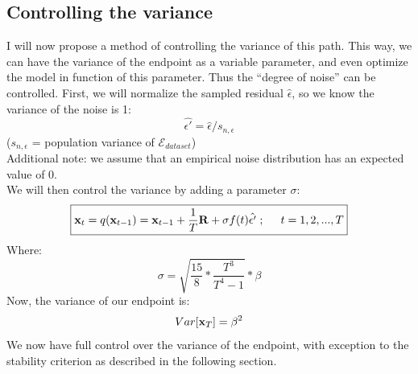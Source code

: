 \documentclass[twocolumn]{article}
\begin{document}
\begin{appendices}
\subsection{Controlling the variance}
I will now propose a method of controlling the variance of this path. This way, we can have the variance of the endpoint as a variable parameter, and even optimize the model in function of this parameter. Thus the ``degree of noise'' can be controlled.   
First, we will normalize the sampled residual $\hat{\epsilon}$, so we know the variance of the noise is 1:
\begin{equation}
    \hat{\epsilon'} = \hat{\epsilon} / s_{n,\epsilon}
\end{equation}
($s_{n,\epsilon}$ = population variance of $\mathcal{E}_{dataset}$)\\
Additional note: we assume that an empirical noise distribution has an expected value of 0.\\
We will then control the variance by adding a parameter $\sigma$:
\begin{equation}
    \boxed{\bold{x}_t = q(\bold{x}_{t-1}) = \bold{x}_{t-1} + \frac{1}{T} \bold{R} + \sigma f(t) \hat{\epsilon'} \hspace{.1cm};\hspace{.5cm} t=1,2,...,T}
\end{equation}
Where: 
\begin{equation} \label{eq:beta}
    \sigma = \sqrt{\frac{15}{8} * \frac{T^3}{T^4 - 1}} * \beta
\end{equation}
Now, the variance of our endpoint is: 
\begin{equation}
    Var[\bold{x}_T] = \beta^2
\end{equation}
We now have full control over the variance of the endpoint, with exception to the stability criterion as described in the following section. 


\end{appendices}
\end{document}
